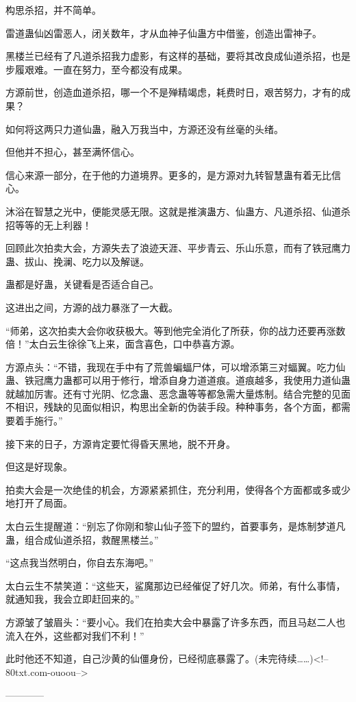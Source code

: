 \begin{this_body}
构思杀招，并不简单。

雷道蛊仙凶雷恶人，闭关数年，才从血神子仙蛊方中借鉴，创造出雷神子。

黑楼兰已经有了凡道杀招我力虚影，有这样的基础，要将其改良成仙道杀招，也是步履艰难。一直在努力，至今都没有成果。

方源前世，创造血道杀招，哪一个不是殚精竭虑，耗费时日，艰苦努力，才有的成果？

如何将这两只力道仙蛊，融入万我当中，方源还没有丝毫的头绪。

但他并不担心，甚至满怀信心。

信心来源一部分，在于他的力道境界。更多的，是方源对九转智慧蛊有着无比信心。

沐浴在智慧之光中，便能灵感无限。这就是推演蛊方、仙蛊方、凡道杀招、仙道杀招等等的无上利器！

回顾此次拍卖大会，方源失去了浪迹天涯、平步青云、乐山乐意，而有了铁冠鹰力蛊、拔山、挽澜、吃力以及解谜。

蛊都是好蛊，关键看是否适合自己。

这进出之间，方源的战力暴涨了一大截。

“师弟，这次拍卖大会你收获极大。等到他完全消化了所获，你的战力还要再涨数倍！”太白云生徐徐飞上来，面含喜色，口中恭喜方源。

方源点头：“不错，我现在手中有了荒兽蝙蝠尸体，可以增添第三对蝠翼。吃力仙蛊、铁冠鹰力蛊都可以用于修行，增添自身力道道痕。道痕越多，我使用力道仙蛊就越加厉害。还有寸光阴、忆念蛊、恶念蛊等等都急需大量炼制。结合完整的见面不相识，残缺的见面似相识，构思出全新的伪装手段。种种事务，各个方面，都需要着手施行。”

接下来的日子，方源肯定要忙得昏天黑地，脱不开身。

但这是好现象。

拍卖大会是一次绝佳的机会，方源紧紧抓住，充分利用，使得各个方面都或多或少地打开了局面。

太白云生提醒道：“别忘了你刚和黎山仙子签下的盟约，首要事务，是炼制梦道凡蛊，组合成仙道杀招，救醒黑楼兰。”

“这点我当然明白，你自去东海吧。”

太白云生不禁笑道：“这些天，鲨魔那边已经催促了好几次。师弟，有什么事情，就通知我，我会立即赶回来的。”

方源皱了皱眉头：“要小心。我们在拍卖大会中暴露了许多东西，而且马赵二人也流入在外，这些都对我们不利！”

此时他还不知道，自己沙黄的仙僵身份，已经彻底暴露了。(未完待续……)<!--80txt.com-ouoou-->

------------

\end{this_body}

